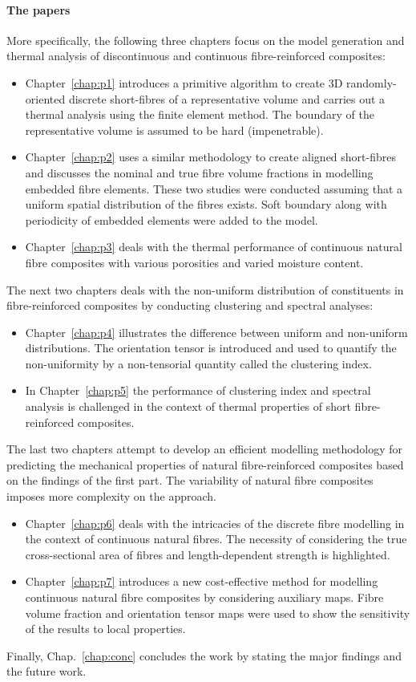 	\paragraph{The papers} More specifically, the following three chapters focus on the model generation and thermal analysis of discontinuous and continuous fibre-reinforced composites:
\begin{itemize}
	\item Chapter~\ref{chap:p1} introduces a primitive algorithm to create 3D randomly-oriented discrete short-fibres of a representative volume and carries out a thermal analysis using the finite element method. The boundary of the representative volume is assumed to be hard (impenetrable).
	\item Chapter~\ref{chap:p2} uses a similar methodology to create aligned short-fibres and discusses the nominal and true fibre volume fractions in modelling embedded fibre elements. These two studies were conducted assuming that a uniform spatial distribution of the fibres exists. Soft boundary along with periodicity of embedded elements were added to the model.
	\item Chapter~\ref{chap:p3} deals with the thermal performance of continuous natural fibre composites with various porosities and varied moisture content.
\end{itemize}
	The next two chapters deals with the non-uniform distribution of constituents in fibre-reinforced composites by conducting clustering and spectral analyses:
\begin{itemize}
	\item Chapter~\ref{chap:p4} illustrates the difference between uniform and non-uniform distributions. The orientation tensor is introduced and used to quantify the non-uniformity by a non-tensorial quantity called the clustering index.
	\item In Chapter~\ref{chap:p5} the performance of clustering index and spectral analysis is challenged in the context of thermal properties of short fibre-reinforced composites.
\end{itemize}
	The last two chapters attempt to develop an efficient modelling methodology for predicting the mechanical properties of natural fibre-reinforced composites based on the findings of the first part. The variability of natural fibre composites imposes more complexity on the approach.  
\begin{itemize}
	\item Chapter~\ref{chap:p6} deals with the intricacies of the discrete fibre modelling in the context of continuous natural fibres. The necessity of considering the true cross-sectional area of fibres and length-dependent strength is highlighted. 
	\item Chapter~\ref{chap:p7} introduces a new cost-effective method for modelling continuous natural fibre composites by considering auxiliary maps. Fibre volume fraction and orientation tensor maps were used to show the sensitivity of the results to local properties.
\end{itemize}
	Finally, Chap.~\ref{chap:conc} concludes the work by stating the major findings and the future work.


